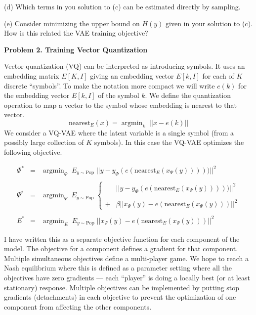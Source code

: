 \documentclass{article}
\newcommand{\pop}{\mathrm{Pop}}
\DeclareMathOperator*{\argmin}{argmin}
\newcommand{\solution}[1]{\bigskip {\color{red} {\bf Solution:} #1}}
\begin{document}
\medskip
(d) Which terms in you solution to (c) can be estimated directly by sampling.

\solution{All}

\medskip
(e) Consider minimizing the upper bound on $H(y)$ given in your solution to (c).  How is this related the VAE training objective?

\solution{It is exactly the same.}

\bigskip

{\bf Problem 2. Training Vector Quantization}

Vector quantization (VQ) can be interpreted as introducing symbols.  It uses an embedding matrix $E[K,I]$ giving an embedding vector $E[k,I]$
for each of $K$ discrete ``symbols''.
To make the notation more compact we will write $e(k)$ for the embedding vector $E[k,I]$ of the symbol $k$.
We define the quantization operation to map a vector to the symbol whose embedding is nearest to that vector.
$$\mathrm{nearest}_E(x) = \argmin_k\;||x - e(k)||$$
We consider a VQ-VAE where the latent variable is a single symbol (from a possibly large collection of $K$ symbols).  In this case the VQ-VAE optimizes the following objective.

\begin{eqnarray}
  \label{eq:VQPhi}
  \Phi^* & = & \argmin_{\Phi}\;E_{y \sim \pop}\; ||y-y_\Phi(e(\mathrm{nearest}_E(x_\Psi(y)))))||^2 \\
  \nonumber \\
  \label{eq:VQPsi}
  \Psi^* & = & \argmin_{\Psi}\;E_{y \sim \pop}\;\left\{\begin{array}{ll} &||y-y_\Phi(e(\mathrm{nearest}_E(x_\Psi(y)))))||^2
  \\ \\ + & \beta||x_\Psi(y) - e(\mathrm{nearest}_E(x_\Psi(y)))||^2\end{array}\right. \\
  \nonumber \\
  \label{eq:VQE}
  E^* & = & \argmin_E \;E_{y \sim \pop}\;||x_\Psi(y) - e(\mathrm{nearest}_E(x_\Psi(y)))||^2
\end{eqnarray}

I have written this as a separate objective function for each component of the model.  The objective for a component defines a gradient for that component.
Multiple simultaneous objectives define a multi-player game.  We hope to reach a Nash equilibrium where this is defined as a parameter setting
where all the objectives have zero gradients --- each ``player'' is doing a locally best (or at least stationary) response.
Multiple objectives can be implemented by putting stop gradients (detachments) in each objective to prevent the optimization of one component from affecting the other
components.
\end{document}
